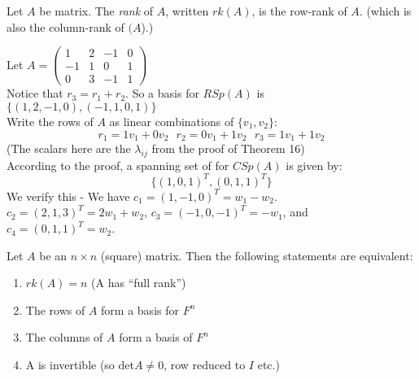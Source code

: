  
\begin{definition} Let $A$ be matrix. The \emph{rank} of $A$, written $rk(A)$, is the row-rank of $A$. (which is also the column-rank of $(A$).)	
\end{definition}\vspace*{10pt}


\begin{example}Let $A = \left(\begin{smallmatrix}
 1 & 2 & -1 & 0\\ -1 & 1 & 0 & 1\\ 0 & 3 & -1 & 1
 \end{smallmatrix}\right)$\\
 
 Notice that $r_3 = r_1 + r_2$. So a basis for $RSp(A)$ is $\{(1,2,-1,0),(-1,1,0,1)\}$\\
 
 Write the rows of $A$ as linear combinations of $\{v_1,v_2\}$:
 \[r_1 = 1v_1 + 0v_2~~~ r_2 = 0v_1 + 1v_2~~~ r_3 = 1v_1 + 1v_2\] (The scalars here are the $\lambda_{ij}$ from the proof of Theorem 16)\\
 
 According to the proof, a spanning set of for $CSp(A)$ is given by: \[\{(1,0,1)^T,(0,1,1)^T\}\] We verify this - 
 We have $c_1 = (1,-1,0)^T = w_1 - w_2$. $c_2 = (2,1,3)^T = 2w_1 + w_2$, $c_3 = (-1,0,-1)^T = -w_1$, and $c_4 = (0,1,1)^T = w_2$.
 \end{example}\vspace*{10pt}

\begin{proposition} 
 Let $A$ be an $n \times n$ (square) matrix. Then the following statements are equivalent:
\begin{enumerate}
\item $rk(A) = n$ (A has ``full rank'')
\item The rows of $A$ form a basis for $F^n$
\item The columns of $A$ form a basis of $F^n$
\item A is invertible (so det$A \neq 0$, row reduced to $I$ etc.)
\end{enumerate}
\end{proposition}

